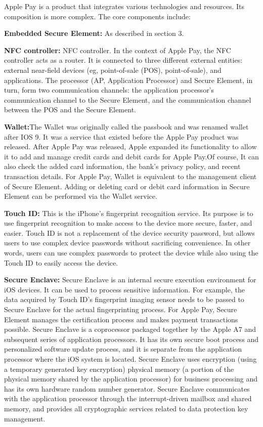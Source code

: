 \documentclass[journal]{IEEEtran}
\begin{document}
Apple Pay is a product that integrates various technologies and resources. Its composition is more complex. The core components include:



\textbf{Embedded Secure Element:} As described in section 3.
    
    \textbf{NFC controller:} NFC controller. In the context of Apple Pay, the NFC controller acts as a router. It is connected to three different external entities: external near-field devices (eg, point-of-sale (POS), point-of-sale), and applications. The processor (AP, Application Processor) and Secure Element, in turn, form two communication channels: the application processor's communication channel to the Secure Element, and the communication channel between the POS and the Secure Element.
    
    \textbf{Wallet:}The Wallet was originally called the passbook and was renamed wallet after IOS 9. It was a service that existed before the Apple Pay product was released. After Apple Pay was released, Apple expanded its functionality to allow it to add and manage credit cards and debit cards for Apple Pay.Of course, It can also check the added card information, the bank's privacy policy, and recent transaction details. For Apple Pay, Wallet is equivalent to the management client of Secure Element. Adding or deleting card or debit card information in Secure Element can be performed via the Wallet service.
   
    \textbf{Touch ID:} This is the iPhone's fingerprint recognition service. Its purpose is to use fingerprint recognition to make access to the device more secure, faster, and easier. Touch ID is not a replacement of the device security password, but allows users to use complex device passwords without sacrificing convenience. In other words, users can use complex passwords to protect the device while also using the Touch ID to easily access the device.
   
    \textbf{Secure Enclave:} Secure Enclave is an internal secure execution environment for iOS devices. It can be used to process sensitive information. For example, the data acquired by Touch ID's fingerprint imaging sensor needs to be passed to Secure Enclave for the actual fingerprinting process. For Apple Pay, Secure Element manages the certification process and makes payment transactions possible.
    Secure Enclave is a coprocessor packaged together by the Apple A7 and subsequent series of application processors. It has its own secure boot process and personalized software update process, and it is separate from the application processor where the iOS system is located. Secure Enclave uses encryption (using a temporary generated key encryption) physical memory (a portion of the physical memory shared by the application processor) for business processing and has its own hardware random number generator. Secure Enclave communicates with the application processor through the interrupt-driven mailbox and shared memory, and provides all cryptographic services related to data protection key management.
\end{document}
